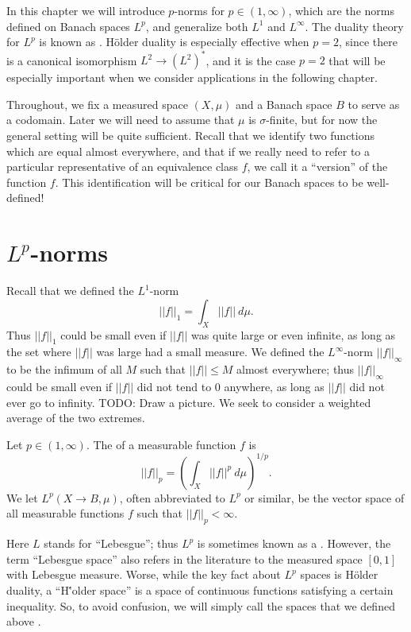 In this chapter we will introduce $p$-norms for $p \in (1, \infty)$, which are the norms defined on Banach spaces $L^p$, and generalize both $L^1$ and $L^\infty$.
The duality theory for $L^p$ is known as .
H\"older duality is especially effective when $p = 2$, since there is a canonical isomorphism $L^2 \to (L^2)^*$, and it is the case $p = 2$ that will be especially important when we consider applications in the following chapter.

Throughout, we fix a measured space $(X, \mu)$ and a Banach space $B$ to serve as a codomain.
Later we will need to assume that $\mu$ is $\sigma$-finite, but for now the general setting will be quite sufficient.
Recall that we identify two functions which are equal almost everywhere, and that if we really need to refer to a particular representative of an equivalence class $f$, we call it a ``version'' of the function $f$.
This identification will be critical for our Banach spaces to be well-defined!

\section{$L^p$-norms}
Recall that we defined the $L^1$-norm
\[||f||_1 = \int_{X} ||f||~d\mu.\]
Thus $||f||_1$ could be small even if $||f||$ was quite large or even infinite, as long as the set where $||f||$ was large had a small measure.
We defined the $L^\infty$-norm $||f||_\infty$ to be the infimum of all $M$ such that $||f|| \leq M$ almost everywhere; thus $||f||_\infty$ could be small even if $||f||$ did not tend to $0$ anywhere, as long as $||f||$ did not ever go to infinity.
TODO: Draw a picture.
We seek to consider a weighted average of the two extremes.

\begin{definition}
Let $p \in (1, \infty)$.
The  of a measurable function $f$ is
\begin{equation}\label{Lp definition}
||f||_{p}  = \left(\int_{X} ||f||^{p} ~d\mu\right)^{1/p}.
\end{equation}
We let $L^p(X \to B, \mu)$, often abbreviated to $L^p$ or similar, be the vector space of all measurable functions $f$ such that $||f||_{p}  < \infty$.
\end{definition}

Here $L$ stands for ``Lebesgue''; thus $L^p$ is sometimes known as a .
However, the term ``Lebesgue space'' also refers in the literature to the measured space $[0, 1]$ with Lebesgue measure.
Worse, while the key fact about $L^p$ spaces is H\"older duality, a ``H\''older space'' is a space of continuous functions satisfying a certain inequality.
So, to avoid confusion, we will simply call the spaces that we defined above .

